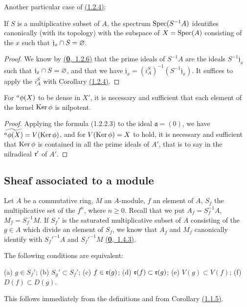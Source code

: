 Another particular case of \hyperref[cor-1.1.2.4]{(1.2.4)}:
\begin{cor}[1.2.6]
\label{cor-1.1.2.6}
If $S$ is a multiplicative subset of $A$, the spectrum ${\mathop{\mathrm{Spec}}\nolimits}(S^{-1}A)$ identifies
canonically (with its topology) with the subspace of $X={\mathop{\mathrm{Spec}}\nolimits}(A)$ consisting of the $x$
such that $\mathfrak{j}_x\cap S=\varnothing$.
\end{cor}

\begin{proof}
\label{proof-cor-1.1.2.6}
We know by \hyperref[env-0.1.2.6]{(\textbf{0},~1.2.6)} that the prime ideals of $S^{-1}A$ are the ideals
$S^{-1}\mathfrak{j}_x$ such that $\mathfrak{j}_x\cap S=\varnothing$, and that we have
$\mathfrak{j}_x=(i_A^S)^{-1}(S^{-1}\mathfrak{j}_x)$. It suffices to apply the $i_A^S$
with Corollary \hyperref[cor-1.1.2.4]{(1.2.4)}.
\end{proof}

\begin{cor}[1.2.7]
\label{cor-1.1.2.7}
For ${}^a\phi(X)$ to be dense in $X'$, it is necessary and sufficient that each element
of the kernel ${\mathop{\mathrm{Ker}}\nolimits}\,\phi$ is nilpotent.
\end{cor}

\begin{proof}
\label{proof-cor-1.1.2.7}
Applying the formula (1.2.2.3) to the ideal $\mathfrak{a}=(0)$, we have
$\widetilde{{}^a\phi(X)}=V({\mathop{\mathrm{Ker}}\nolimits}\,\phi)$, and for $V({\mathop{\mathrm{Ker}}\nolimits}\,\phi)=X$ to hold, it is necessary
and sufficient that ${\mathop{\mathrm{Ker}}\nolimits}\,\phi$ is contained in all the prime ideals of $A'$, that is to say
in the nilradical $\mathfrak{r}'$ of $A'$.
\end{proof}

\subsection{Sheaf associated to a module}
\label{subsection-assoc-sheaf}

\begin{env}[1.3.1]
\label{env-1.1.3.1}
Let $A$ be a commutative ring, $M$ an $A$-module, $f$ an element of $A$, $S_f$ the
multiplicative set of the $f^n$, where $n\geqslant 0$. Recall that we put $A_f=S_f^{-1}A$,
$M_f=S_f^{-1}M$. If $S_f'$ is the saturated multiplicative subset of $A$ consisting of the
$g\in A$ which divide an element of $S_f$, we know that $A_f$ and $M_f$ canonically identify
with ${S_f'}^{-1}A$ and ${S_f'}^{-1}M$ \hyperref[env-0.1.4.3]{(\textbf{0},~1.4.3)}.
\end{env}

\begin{lem}[1.3.2]
\label{lem-1.1.3.2}
The following conditions are equivalent:
\begin{center}
{\rm(a)} $g\in S_f'$;
{\rm(b)} $S_g'\subset S_f'$;
{\rm(c)} $f\in\mathfrak{r}(g)$;
{\rm(d)} $\mathfrak{r}(f)\subset\mathfrak{r}(g)$;
{\rm(e)} $V(g)\subset V(f)$;
{\rm(f)} $D(f)\subset D(g)$.
\end{center}
\end{lem}
This follows immediately from the definitions and from
Corollary \hyperref[cor-1.1.1.5]{(1.1.5)}.

